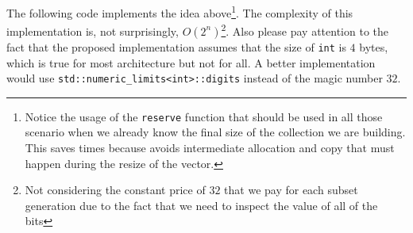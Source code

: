 The following code implements the idea above\footnote{Notice the usage of the \texttt{reserve}
function that should be used in all those scenario when we already know the final size of the
collection we are building. This saves times because avoids intermediate allocation and copy that
must happen during the resize of the vector.}. The complexity of this implementation is, not
surprisingly, $O(2^n)$\footnote{Not considering the constant price of $32$ that we pay for each
subset generation due to the fact that we need to inspect the value of all of the bits}. Also please
pay attention to the fact that the proposed implementation assumes that the size of
\lstinline[columns=fixed]{int} is $4$ bytes, which is true for most architecture but not for all\cite{cit::std::fundamentaltypes}. A better
implementation would use \lstinline[columns=fixed]{std::numeric_limits<int>::digits} instead of
the magic number $32$.


\begin{minipage}{\linewidth}
	
\end{minipage}



